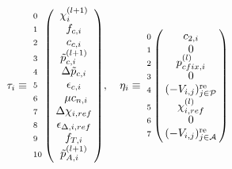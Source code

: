 \documentclass[a4paper,10pt]{article}
\begin{document}
\begin{equation}\notag
\tau_i \equiv
\bordermatrix {
                &                                     \cr
\scriptstyle{0} &  \chi^{(l+1)}_i                     \cr
\scriptstyle{1} &   f_{c,i}                           \cr
\scriptstyle{2} &   c_{c,i}                           \cr
\scriptstyle{3} &   \tilde{p}^{(l+1)}_{c,i}           \cr
\scriptstyle{4} &   \Delta \tilde{p}_{c,i}            \cr
\scriptstyle{5} &   \epsilon_{c,i}                    \cr
\scriptstyle{6} &   \\ \mu c_{n,i}                    \cr
\scriptstyle{7} &   \Delta\chi_{i,ref}                \cr
\scriptstyle{8} &   \epsilon_{\Delta,i,ref}           \cr
\scriptstyle{9} &   f_{T,i}                           \cr
\scriptstyle{10}&   \tilde{p}^{(l+1)}_{A,i}
}
, \quad
\eta_i \equiv
\bordermatrix {
                &                                              \cr
\scriptstyle{0} &   c_{2,i}                                    \cr
\scriptstyle{1} &   0                                          \cr
\scriptstyle{2} &   p_{cfix, i}^{(l)}                          \cr
\scriptstyle{3} &   0                                          \cr
\scriptstyle{4} &   (-V_{i,j})_{j \in \mathcal{P}}^\text{re}   \cr
\scriptstyle{5} &   \chi^{(l)}_{i,ref}                         \cr
\scriptstyle{6} &   0                                          \cr
\scriptstyle{7} &   (-V_{i,j})_{j \in \mathcal{A}}^\text{re}   
}
\end{equation}
\pagebreak





\end{document}
